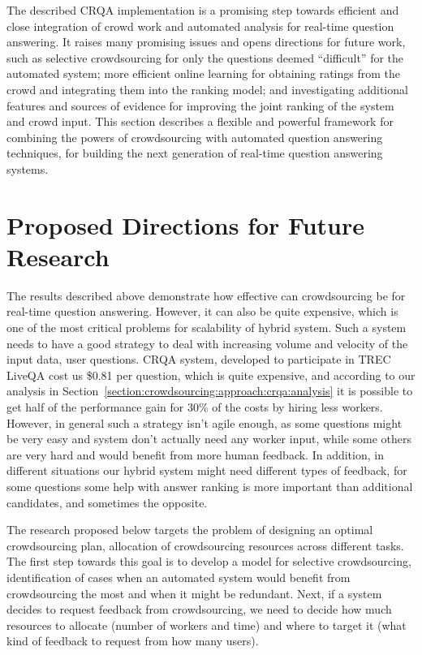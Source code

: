 The described CRQA implementation is a promising step towards efficient and close integration of crowd work and automated analysis for real-time question answering.
It raises many promising issues and opens directions for future work, such as selective crowdsourcing for only the questions deemed ``difficult'' for the automated system; more efficient online learning for obtaining ratings from the crowd and integrating them into the ranking model; and investigating additional features and sources of evidence for improving the joint ranking of the system and crowd input.
This section describes a flexible and powerful framework for combining the powers of crowdsourcing with automated question answering techniques, for building the next generation of real-time question answering systems.

\section{Proposed Directions for Future Research}
\label{section:crowdsourcing:proposal}

The results described above demonstrate how effective can crowdsourcing be for real-time question answering.
However, it can also be quite expensive, which is one of the most critical problems for scalability of hybrid system.
Such a system needs to have a good strategy to deal with increasing volume and velocity of the input data, \ie user questions.
CRQA system, developed to participate in TREC LiveQA cost us \$0.81 per question, which is quite expensive, and according to our analysis in Section~\ref{section:crowdsourcing:approach:crqa:analysis} it is possible to get half of the performance gain for 30\% of the costs by hiring less workers.
However, in general such a strategy isn't agile enough, as some questions might be very easy and system don't actually need any worker input, while some others are very hard and would benefit from more human feedback.
In addition, in different situations our hybrid system might need different types of feedback, \eg for some questions some help with answer ranking is more important than additional candidates, and sometimes the opposite.

The research proposed below targets the problem of designing an optimal crowdsourcing plan, \ie allocation of crowdsourcing resources across different tasks.
The first step towards this goal is to develop a model for selective crowdsourcing, \ie identification of cases when an automated system would benefit from crowdsourcing the most and when it might be redundant.
Next, if a system decides to request feedback from crowdsourcing, we need to decide how much resources to allocate (number of workers and time) and where to target it (what kind of feedback to request from how many users).

